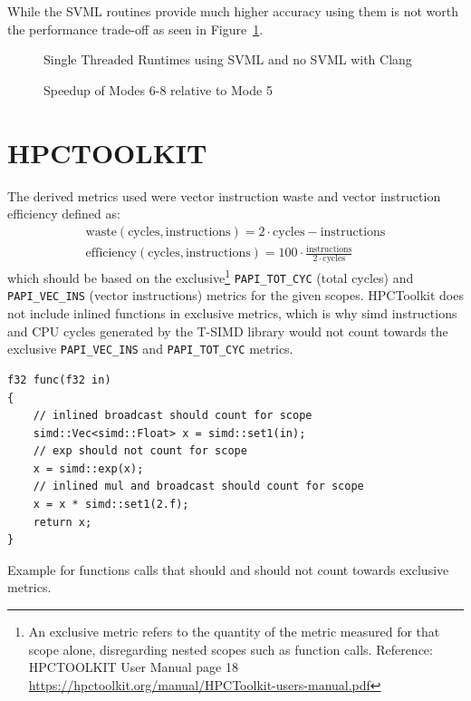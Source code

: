 \documentclass[a4paper, 11pt]{memoir}
\begin{document}
    While the SVML routines provide much higher accuracy using them is not worth the
    performance trade-off as seen in Figure~\ref{fig:runtimes_st_svml_v_no}.
    \begin{figure}[H]
        \centering
        
        \caption{Single Threaded Runtimes using SVML and no SVML with Clang}
        \label{fig:runtimes_st_svml_v_no}
    \end{figure}

    \begin{figure}[H]
        \centering
        
        \caption{Speedup of Modes 6-8 relative to Mode 5}
        \label{fig:runtimes_st_v_mt}
    \end{figure}

    \section{HPCTOOLKIT}
    \cite{hpc_toolkit}

    The derived metrics used were vector instruction waste and vector instruction efficiency defined as:
    \begin{align}
        \text{waste}(\text{cycles}, \text{instructions}) = 2 \cdot \text{cycles} - \text{instructions} \label{eq:vec_waste}\\
        \text{efficiency}(\text{cycles}, \text{instructions}) = 100 \cdot \frac{\text{instructions}}{2\cdot\text{cycles}} \label{eq:vec_efficiency}
    \end{align}
    which should be based on the exclusive\footnote{An exclusive metric refers to the quantity of the metric measured for that scope
    alone, disregarding nested scopes such as function calls. Reference: HPCTOOLKIT User Manual page 18
    \href{https://hpctoolkit.org/manual/HPCToolkit-users-manual.pdf}{https://hpctoolkit.org/manual/HPCToolkit-users-manual.pdf}}
    \texttt{PAPI_TOT_CYC} (total cycles) and \texttt{PAPI_VEC_INS}
    (vector instructions) metrics for the given scopes. HPCToolkit does not include inlined functions in exclusive metrics, which is why \gls{simd}
    instructions and CPU cycles generated by the T-SIMD library would not count towards the exclusive \texttt{PAPI_VEC_INS} and \texttt{PAPI_TOT_CYC}
    metrics.

    \begin{listing}[H]
        \begin{verbatim}
f32 func(f32 in)
{
    // inlined broadcast should count for scope
    simd::Vec<simd::Float> x = simd::set1(in);
    // exp should not count for scope
    x = simd::exp(x);
    // inlined mul and broadcast should count for scope
    x = x * simd::set1(2.f);
    return x;
}
        \end{verbatim}
        \caption{Example for functions calls that should and should not count towards exclusive metrics.}
        \label{lst:scopes_example}
    \end{listing}
\end{document}
